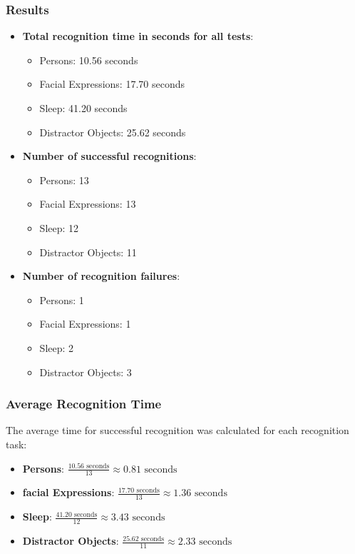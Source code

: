 \documentclass[a4paper,fleqn]{cas-sc}
\begin{document}
			\subsubsection{Results}
				\begin{itemize}
					\item \textbf{Total recognition time in seconds for all tests}: 
					\begin{itemize}
						\item Persons: 10.56 seconds
						\item Facial Expressions: 17.70 seconds
						\item Sleep: 41.20 seconds
						\item Distractor Objects: 25.62 seconds
					\end{itemize}
					\item \textbf{Number of successful recognitions}:
					\begin{itemize}
						\item Persons: 13
						\item Facial Expressions: 13
						\item Sleep: 12
						\item Distractor Objects: 11
					\end{itemize}
					\item \textbf{Number of recognition failures}:
					\begin{itemize}
						\item Persons: 1
						\item Facial Expressions: 1
						\item Sleep: 2
						\item Distractor Objects: 3
					\end{itemize}
				\end{itemize}

			\subsubsection{Average Recognition Time}
				The average time for successful recognition was calculated for each recognition task:
				
				\begin{itemize}
					\item \textbf{Persons}: \(\frac{10.56 \text{ seconds}}{13} \approx 0.81 \text{ seconds}\)
					\item \textbf{facial Expressions}: \(\frac{17.70 \text{ seconds}}{13} \approx 1.36 \text{ seconds}\)
					\item \textbf{Sleep}: \(\frac{41.20 \text{ seconds}}{12} \approx 3.43 \text{ seconds}\)
					\item \textbf{Distractor Objects}: \(\frac{25.62 \text{ seconds}}{11} \approx 2.33 \text{ seconds}\)
				\end{itemize}
\end{document}
